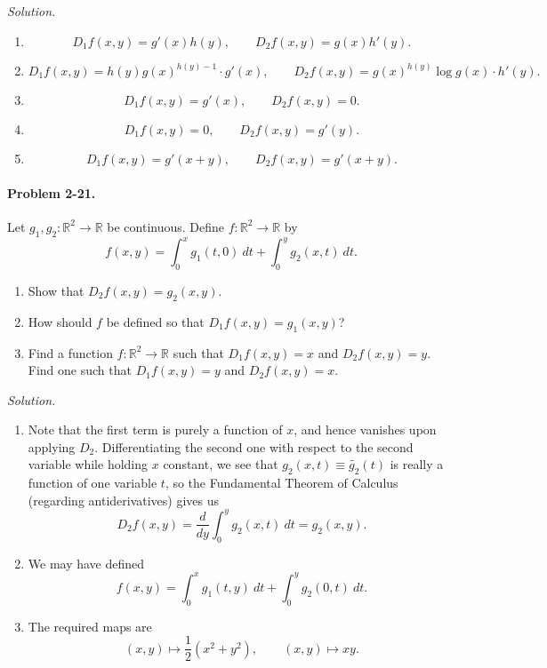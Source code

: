 \documentclass[11pt]{report}
\newcommand{\R}{\mathbb{R}}
\newcommand{\dd}[2]{\frac{d #1}{d #2}}
\newcommand{\problem}[1]{\paragraph{Problem #1.}}
\newcommand{\solution}{\noindent\textit{Solution.} }
\begin{document}
    \solution \begin{enumerate}
        \item \[
            D_1f(x, y) = g'(x)h(y), \qquad
            D_2f(x, y) = g(x)h'(y).
        \] 

        \item \[
            D_1f(x, y) = h(y) g(x)^{h(y) - 1} \cdot g'(x), \qquad
            D_2f(x, y) = g(x)^{h(y)}\log{g(x)}\cdot h'(y).
        \] 

        \item \[
            D_1f(x, y) = g'(x), \qquad
            D_2f(x, y) = 0.
        \] 

        \item \[
            D_1f(x, y) = 0, \qquad
            D_2f(x, y) = g'(y).
        \] 

        \item \[
            D_1f(x, y) = g'(x + y), \qquad
            D_2f(x, y) = g'(x + y).
        \] 
    \end{enumerate}


    \problem{2-21} Let $g_1, g_2\colon \R^2 \to \R$ be continuous. Define $f\colon
    \R^2 \to \R$ by \[
        f(x, y) = \int_0^x g_1(t, 0)\:dt + \int_0^y g_2(x, t)\:dt.
    \] 
    \begin{enumerate}
        \item Show that $D_2f(x, y) = g_2(x, y)$.
        \item How should $f$ be defined so that $D_1f(x, y) = g_1(x, y)$?
        \item Find a function $f\colon \R^2 \to \R$ such that $D_1f(x, y) = x$ and
        $D_2f(x, y) = y$. Find one such that $D_1f(x, y) = y$ and $D_2f(x, y) = x$.
    \end{enumerate}

    \solution \begin{enumerate}
        \item Note that the first term is purely a function of $x$, and hence
        vanishes upon applying $D_2$. Differentiating the second one with respect to
        the second variable while holding $x$ constant, we see that $g_2(x, t) \equiv
        \tilde{g_2}(t)$ is really a function of one variable $t$, so the Fundamental
        Theorem of Calculus (regarding antiderivatives) gives us \[
            D_2f(x, y) = \dd{}{y} \int_0^y g_2(x, t)\:dt = g_2(x, y).
        \] 

        \item We may have defined \[
            f(x, y) = \int_0^x g_1(t, y)\:dt + \int_0^y g_2(0, t)\:dt.
        \] 

        \item The required maps are \[
            (x, y) \mapsto \frac{1}{2}(x^2 + y^2), \qquad 
            (x, y) \mapsto xy.
        \] 
    \end{enumerate}
\end{document}
